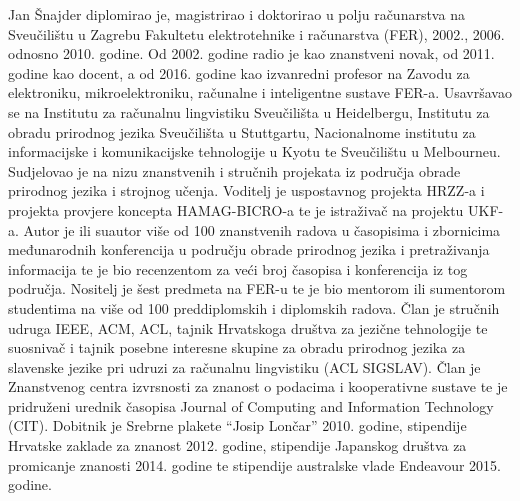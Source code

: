 Jan Šnajder diplomirao je,  magistrirao i doktorirao u polju računarstva na
Sveučilištu u Zagrebu Fakultetu elektrotehnike i računarstva (FER), 2002.,
2006. odnosno 2010. godine. Od 2002. godine radio je kao znanstveni novak, od
2011. godine kao docent, a od 2016. godine kao izvanredni profesor na Zavodu za
elektroniku, mikroelektroniku, računalne i inteligentne sustave FER-a.
Usavršavao se na Institutu za računalnu lingvistiku Sveučilišta u
Heidelbergu, Institutu za obradu prirodnog jezika Sveučilišta u Stuttgartu,
Nacionalnome institutu za informacijske i komunikacijske tehnologije u Kyotu
te Sveučilištu u Melbourneu. Sudjelovao je na nizu znanstvenih i stručnih
projekata iz područja obrade prirodnog jezika i strojnog učenja. Voditelj je
uspostavnog projekta HRZZ-a i projekta provjere koncepta HAMAG-BICRO-a te
je istraživač na projektu UKF-a. Autor je ili suautor više od 100 znanstvenih
radova u časopisima i zbornicima međunarodnih konferencija u području obrade
prirodnog jezika i pretraživanja informacija te je bio recenzentom za veći
broj časopisa i konferencija iz tog područja. Nositelj je šest predmeta na
FER-u te je bio mentorom ili sumentorom studentima na više od 100
preddiplomskih i diplomskih radova. Član je stručnih udruga IEEE, ACM, ACL,
tajnik Hrvatskoga društva za jezične tehnologije te suosnivač i tajnik posebne
interesne skupine za obradu prirodnog jezika za slavenske jezike pri udruzi za
računalnu lingvistiku (ACL SIGSLAV). Član je Znanstvenog centra izvrsnosti za
znanost o podacima i kooperativne sustave te je pridruženi urednik časopisa
Journal of Computing and Information Technology (CIT). Dobitnik je
Srebrne plakete ``Josip Lončar'' 2010. godine, stipendije Hrvatske zaklade za
znanost 2012. godine, stipendije Japanskog društva za promicanje znanosti
2014. godine te stipendije australske vlade Endeavour 2015. godine.
